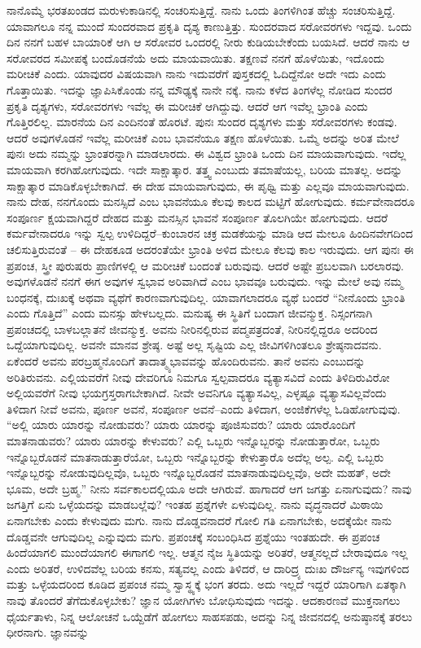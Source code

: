 ನಾನೊಮ್ಮೆ ಭರತಖಂಡದ ಮರುಳುಕಾಡಿನಲ್ಲಿ ಸಂಚರಿಸುತ್ತಿದ್ದೆ. ನಾನು ಒಂದು ತಿಂಗಳಿಗಿಂತ ಹೆಚ್ಚು ಸಂಚರಿಸುತ್ತಿದ್ದೆ. ಯಾವಾಗಲೂ ನನ್ನ ಮುಂದೆ ಸುಂದರವಾದ ಪ್ರಕೃತಿ ದೃಶ್ಯ ಕಾಣುತ್ತಿತ್ತು. ಸುಂದರವಾದ ಸರೋವರಗಳು ಇದ್ದವು. ಒಂದು ದಿನ ನನಗೆ ಬಹಳ ಬಾಯಾರಿಕೆ ಆಗಿ ಆ ಸರೋವರ ಒಂದರಲ್ಲಿ ನೀರು ಕುಡಿಯಬೇಕೆಂದು ಬಯಸಿದೆ. ಆದರೆ ನಾನು ಆ ಸರೋವರದ ಸಮೀಪಕ್ಕೆ ಬಂದೊಡನೆಯೆ ಅದು ಮಾಯವಾಯಿತು. ತಕ್ಷಣವೆ ನನಗೆ ಹೊಳೆಯಿತು, ಇದೊಂದು ಮರೀಚಿಕೆ ಎಂದು. ಯಾವುದರ ವಿಷಯವಾಗಿ ನಾನು ಇದುವರೆಗೆ ಪುಸ್ತಕದಲ್ಲಿ ಓದಿದ್ದೆನೋ ಅದೇ ಇದು ಎಂದು ಗೊತ್ತಾಯಿತು. ಇದನ್ನು ಜ್ಞಾಪಿಸಿಕೊಂಡು ನನ್ನ ಮೌಢ್ಯಕ್ಕೆ ನಾನೇ ನಕ್ಕೆ. ನಾನು ಕಳೆದ ತಿಂಗಳೆಲ್ಲ ನೋಡಿದ ಸುಂದರ ಪ್ರಕೃತಿ ದೃಶ್ಯಗಳು, ಸರೋವರಗಳು ಇವೆಲ್ಲ ಈ ಮರೀಚಿಕೆ ಆಗಿದ್ದುವು. ಆದರೆ ಆಗ ಇವೆಲ್ಲ ಭ್ರಾಂತಿ ಎಂದು ಗೊತ್ತಿರಲಿಲ್ಲ. ಮಾರನೆಯ ದಿನ ಎಂದಿನಂತೆ ಹೊರಟೆ. ಪುನಃ ಸುಂದರ ದೃಶ್ಯಗಳು ಮತ್ತು ಸರೋವರಗಳು ಕಂಡವು. ಆದರೆ ಅವುಗಳೊಡನೆ ಇವೆಲ್ಲ ಮರೀಚಿಕೆ ಎಂಬ ಭಾವನೆಯೂ ತಕ್ಷಣ ಹೊಳೆಯಿತು. ಒಮ್ಮೆ ಅದನ್ನು ಅರಿತ ಮೇಲೆ ಪುನಃ ಅದು ನಮ್ಮನ್ನು ಭ್ರಾಂತರನ್ನಾಗಿ ಮಾಡಲಾರದು. ಈ ವಿಶ್ವದ ಭ್ರಾಂತಿ ಒಂದು ದಿನ ಮಾಯವಾಗುವುದು. ಇದೆಲ್ಲ ಮಾಯವಾಗಿ ಕರಗಿಹೋಗುವುದು. ಇದೇ ಸಾಕ್ಷಾತ್ಕಾರ. ತತ್ತ್ವ ಎಂಬುದು ತಮಾಷೆಯಲ್ಲ, ಬರಿಯ ಮಾತಲ್ಲ. ಅದನ್ನು ಸಾಕ್ಷಾತ್ಕಾರ ಮಾಡಿಕೊಳ್ಳಬೇಕಾಗಿದೆ. ಈ ದೇಹ ಮಾಯವಾಗುವುದು, ಈ ಪೃಥ್ವಿ ಮತ್ತು ಎಲ್ಲವೂ ಮಾಯವಾಗುವುದು. ನಾನು ದೇಹ, ನನಗೊಂದು ಮನಸ್ಸಿದೆ ಎಂಬ ಭಾವನೆಯೂ ಕೆಲವು ಕಾಲದ ಮಟ್ಟಿಗೆ ಹೋಗುವುದು. ಕರ್ಮವೇನಾದರೂ ಸಂಪೂರ್ಣ ಕ್ಷಯವಾಗಿದ್ದರೆ ದೇಹದ ಮತ್ತು ಮನಸ್ಸಿನ ಭಾವನೆ ಸಂಪೂರ್ಣ ತೊಲಗಿಯೇ ಹೋಗುವುದು. ಆದರೆ ಕರ್ಮವೇನಾದರೂ ಇನ್ನು ಸ್ವಲ್ಪ ಉಳಿದಿದ್ದರೆ–ಕುಂಬಾರನ ಚಕ್ರ ಮಡಕೆಯನ್ನು ಮಾಡಿ ಆದ ಮೇಲೂ ಹಿಂದಿನವೇಗದಿಂದ ಚಲಿಸುತ್ತಿರುವಂತೆ – ಈ ದೇಹಕೂಡ ಅದರಂತೆಯೇ ಭ್ರಾಂತಿ ಅಳಿದ ಮೇಲೂ ಕೆಲವು ಕಾಲ ಇರುವುದು. ಆಗ ಪುನಃ ಈ ಪ್ರಪಂಚ, ಸ್ತ್ರೀ ಪುರುಷರು ಪ್ರಾಣಿಗಳಲ್ಲಿ ಆ ಮರೀಚಿಕೆ ಬಂದಂತೆ ಬರುವುವು. ಆದರೆ ಅಷ್ಟೇ ಪ್ರಬಲವಾಗಿ ಬರಲಾರವು. ಅವುಗಳೊಡನೆ ನನಗೆ ಈಗ ಅವುಗಳ ಸ್ವಭಾವ ಅರಿವಾಗಿದೆ ಎಂಬ ಭಾವವೂ ಬರುವುದು. ಇನ್ನು ಮೇಲೆ ಅವು ನಮ್ಮ ಬಂಧನಕ್ಕೆ, ದುಃಖಕ್ಕೆ ಅಥವಾ ವ್ಯಥೆಗೆ ಕಾರಣವಾಗುವುದಿಲ್ಲ. ಯಾವಾಗಲಾದರೂ ವ್ಯಥೆ ಬಂದರೆ “ನೀನೊಂದು ಭ್ರಾಂತಿ ಎಂದು ಗೊತ್ತಿದೆ'' ಎಂದು ಮನಸ್ಸು ಹೇಳಬಲ್ಲದು. ಮನುಷ್ಯ ಈ ಸ್ಥಿತಿಗೆ ಬಂದಾಗ ಜೀವನ್ಮುಕ್ತ. ನಿಸ್ಸಂಗನಾಗಿ ಪ್ರಪಂಚದಲ್ಲಿ ಬಾಳಬಲ್ಲಾತನೆ ಜೀವನ್ಮುಕ್ತ. ಅವನು ನೀರಿನಲ್ಲಿರುವ ಪದ್ಮಪತ್ರದಂತೆ, ನೀರಿನಲ್ಲಿದ್ದರೂ ಅದರಿಂದ ಒದ್ದೆಯಾಗುವುದಿಲ್ಲ. ಅವನೇ ಮಾನವ ಶ್ರೇಷ್ಠ. ಅಷ್ಟೆ ಅಲ್ಲ ಸೃಷ್ಟಿಯ ಎಲ್ಲ ಜೀವಿಗಳಿಗಿಂತಲೂ ಶ್ರೇಷ್ಠನಾದವನು. ಏಕೆಂದರೆ ಅವನು ಪರಬ್ರಹ್ಮನೊಂದಿಗೆ ತಾದಾತ್ಮ್ಯಭಾವವನ್ನು ಹೊಂದಿರುವನು. ತಾನೆ ಅವನು ಎಂಬುದನ್ನು ಅರಿತಿರುವನು. ಎಲ್ಲಿಯವರೆಗೆ ನೀವು ದೇವರಿಗೂ ನಿಮಗೂ ಸ್ವಲ್ಪವಾದರೂ ವ್ಯತ್ಯಾಸವಿದೆ ಎಂದು ತಿಳಿದಿರುವಿರೋ ಅಲ್ಲಿಯವರೆಗೆ ನೀವು ಭಯಗ್ರಸ್ತರಾಗಬೇಕಾಗಿದೆ. ನೀವೇ ಅವನಿಗೂ ವ್ಯತ್ಯಾಸವಿಲ್ಲ, ಎಳ್ಳಷ್ಟೂ ವ್ಯತ್ಯಾಸವಿಲ್ಲವೆಂದು ತಿಳಿದಾಗ ನೀವೆ ಅವನು, ಪೂರ್ಣ ಅವನೆ, ಸಂಪೂರ್ಣ ಅವನೆ–ಎಂದು ತಿಳಿದಾಗ, ಅಂಜಿಕೆಗಳೆಲ್ಲ ಓಡಿಹೋಗುವುವು. “ಅಲ್ಲಿ ಯಾರು ಯಾರನ್ನು ನೋಡುವರು? ಯಾರು ಯಾರನ್ನು ಪೂಜಿಸುವರು? ಯಾರು ಯಾರೊಂದಿಗೆ ಮಾತನಾಡುವರು? ಯಾರು ಯಾರನ್ನು ಕೇಳುವರು? ಎಲ್ಲಿ ಒಬ್ಬರು ಇನ್ನೊಬ್ಬರನ್ನು ನೋಡುತ್ತಾರೋ, ಒಬ್ಬರು ಇನ್ನೊಬ್ಬರೊಡನೆ ಮಾತನಾಡುತ್ತಾರೆಯೋ, ಒಬ್ಬರು ಇನ್ನೊಬ್ಬರನ್ನು ಕೇಳುತ್ತಾರೊ ಅದೆಲ್ಲ ಅಲ್ಪ. ಎಲ್ಲಿ ಒಬ್ಬರು ಇನ್ನೊಬ್ಬರನ್ನು ನೋಡುವುದಿಲ್ಲವೊ, ಒಬ್ಬರು ಇನ್ನೊಬ್ಬರೊಡನೆ ಮಾತನಾಡುವುದಿಲ್ಲವೊ, ಅದೇ ಮಹತ್, ಅದೇ ಭೂಮ, ಅದೇ ಬ್ರಹ್ಮ.” ನೀನು ಸರ್ವಕಾಲದಲ್ಲಿಯೂ ಅದೇ ಆಗಿರುವೆ. ಹಾಗಾದರೆ ಆಗ ಜಗತ್ತು ಏನಾಗುವುದು? ನಾವು ಜಗತ್ತಿಗೆ ಏನು ಒಳ್ಳೆಯದನ್ನು ಮಾಡಬಲ್ಲೆವು? ಇಂತಹ ಪ್ರಶ್ನೆಗಳೇ ಏಳುವುದಿಲ್ಲ. ನಾನು ವೃದ್ಧನಾದರೆ ಮಿಠಾಯಿ ಏನಾಗಬೇಕು ಎಂದು ಕೇಳುವುದು ಮಗು. ನಾನು ದೊಡ್ಡವನಾದರೆ ಗೋಲಿ ಗತಿ ಏನಾಗಬೇಕು, ಅದಕ್ಕೆಯೇ ನಾನು ದೊಡ್ಡವನೇ ಆಗುವುದಿಲ್ಲ ಎನ್ನುವುದು ಮಗು. ಪ್ರಪಂಚಕ್ಕೆ ಸಂಬಂಧಿಸಿದ ಪ್ರಶ್ನೆಯು ಇಂತಹುದೇ. ಈ ಪ್ರಪಂಚ ಹಿಂದೆಯಾಗಲಿ ಮುಂದೆಯಾಗಲಿ ಈಗಾಗಲಿ ಇಲ್ಲ. ಆತ್ಮನ ನೈಜ ಸ್ಥಿತಿಯನ್ನು ಅರಿತರೆ, ಆತ್ಮನಲ್ಲದೆ ಬೇರಾವುದೂ ಇಲ್ಲ ಎಂದು ಅರಿತರೆ, ಉಳಿದವೆಲ್ಲ ಬರಿಯ ಕನಸು, ಸತ್ಯವಲ್ಲ ಎಂದು ತಿಳಿದರೆ, ಆ ದಾರಿದ್ರ್ಯ ದುಃಖ ದೌರ್ಜನ್ಯ ಇವುಗಳಿಂದ ಮತ್ತು ಒಳ್ಳೆಯದರಿಂದ ಕೂಡಿದ ಪ್ರಪಂಚ ನಮ್ಮ ಸ್ವಾಸ್ಥ್ಯಕ್ಕೆ ಭಂಗ ತರದು. ಅದು ಇಲ್ಲದೆ ಇದ್ದರೆ ಯಾರಿಗಾಗಿ ಏತಕ್ಕಾಗಿ ನಾವು ತೊಂದರೆ ತೆಗೆದುಕೊಳ್ಳಬೇಕು? ಜ್ಞಾನ ಯೋಗಿಗಳು ಬೋಧಿಸುವುದು ಇದನ್ನು. ಆದಕಾರಣವೆ ಮುಕ್ತನಾಗಲು ಧೈರ್ಯತಾಳು, ನಿನ್ನ ಆಲೋಚನೆ ಒಯ್ದೆಡೆಗೆ ಹೋಗಲು ಸಾಹಸಪಡು, ಅದನ್ನು ನಿನ್ನ ಜೀವನದಲ್ಲಿ ಅನುಷ್ಠಾನಕ್ಕೆ ತರಲು ಧೀರನಾಗು. ಜ್ಞಾನವನ್ನು 